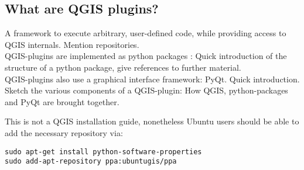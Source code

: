 \subsection{What are QGIS plugins?}
\par
A framework to execute arbitrary, user-defined code, while providing access to QGIS internals. Mention repositories.\\
QGIS-plugins are implemented as python packages : Quick introduction of the structure of a python package, give references to further material.\\
QGIS-plugins also use a graphical interface framework: PyQt. Quick introduction.\\
Sketch the various components of a QGIS-plugin: How QGIS, python-packages and PyQt are brought together.

This is not a QGIS installation guide, nonetheless Ubuntu users should be able to add the necessary repository via:
\begin{lstlisting}
sudo apt-get install python-software-properties
sudo add-apt-repository ppa:ubuntugis/ppa
\end{lstlisting}
